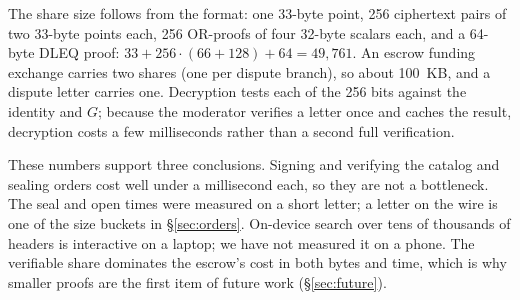 The share size follows from the format: one 33-byte point, 256 ciphertext pairs of two 33-byte points each, 256 OR-proofs of four 32-byte scalars each, and a 64-byte DLEQ proof: $33+256\cdot(66+128)+64=49{,}761$. An escrow funding exchange carries two shares (one per dispute branch), so about 100~KB, and a dispute letter carries one. Decryption tests each of the 256 bits against the identity and $G$; because the moderator verifies a letter once and caches the result, decryption costs a few milliseconds rather than a second full verification.

These numbers support three conclusions. Signing and verifying the catalog and sealing orders cost well under a millisecond each, so they are not a bottleneck. The seal and open times were measured on a short letter; a letter on the wire is one of the size buckets in \S\ref{sec:orders}. On-device search over tens of thousands of headers is interactive on a laptop; we have not measured it on a phone. The verifiable share dominates the escrow's cost in both bytes and time, which is why smaller proofs are the first item of future work (\S\ref{sec:future}).

